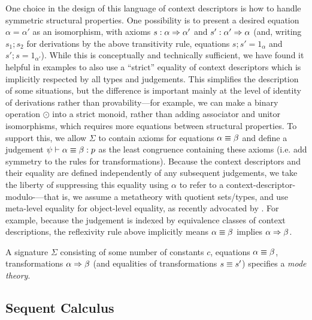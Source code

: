 One choice in the design of this language of context descriptors is how
to handle symmetric structural properties.  One possibility is to
present a desired equation $\alpha = \alpha'$ as an isomorphism, with
axioms $s : \alpha \Rightarrow \alpha'$ and $s' : \alpha' \Rightarrow \alpha$ (and,
writing $s_1;s_2$ for derivations by the above transitivity rule,
equations $s;s' = 1_{\alpha}$ and $s';s = 1_{\alpha'}$).  While this is
conceptually and technically sufficient, we have found it helpful in
examples to also use a ``strict'' equality of context descriptors which
is implicitly respected by all types and judgements.  This simplifies
the description of some situations, but the difference is important
mainly at the level of identity of derivations rather than
provability---for example, we can make a binary operation $\odot$ into a
strict monoid, rather than adding associator and unitor isomorphisms,
which requires more equations between structural properties.  To support
this, we allow $\Sigma$ to contain axioms for equations $\alpha \equiv
\beta$ and define a judgement $\psi \vdash \alpha \equiv \beta : p$ as the
least congruence containing these axioms (i.e. add symmetry to the rules
for transformations).  Because the context descriptors and their
equality are defined independently of any subsequent judgements, we take
the liberty of suppressing this equality using $\alpha$ to refer to a
context-descriptor-modulo-\deq---that is, we assume a metatheory with
quotient sets/types, and use meta-level equality for object-level
equality, as recently advocated by \citet{altenkirchkaposiXXpopl}.  For
example, because the judgement  is indexed
by equivalence classes of context descriptions, the reflexivity rule
above implicitly means $\alpha \equiv \beta$ implies $\alpha \Rightarrow \beta$.  

A signature $\Sigma$ consisting of some number of constants $c$,
equations $\alpha \equiv \beta$, transformations $\alpha \Rightarrow \beta$ (and
equalities of transformations $s \equiv s'$) specifies a \emph{mode theory}.

\subsection{Sequent Calculus}

